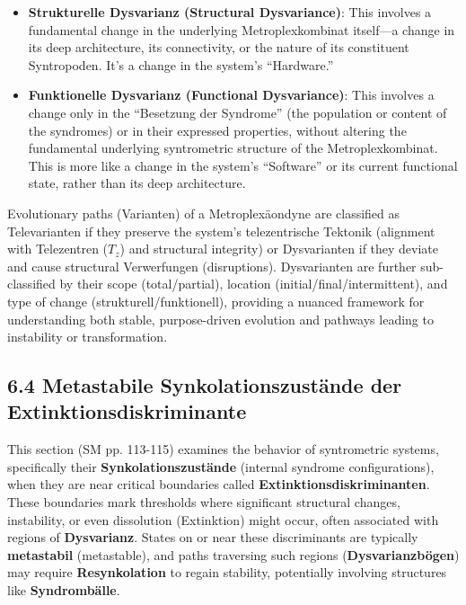 \documentclass[12pt]{article}
\newcommand{\q}[1]{\enquote{#1}}
\newcommand{\telezentrum}{T_z}
\begin{document}
\begin{itemize}
\begin{enumerate}
\begin{itemize}
            \item \textbf{Strukturelle Dysvarianz (Structural Dysvariance)}: This involves a fundamental change in the underlying Metroplexkombinat itself—a change in its deep architecture, its connectivity, or the nature of its constituent Syntropoden. It's a change in the system's \q{Hardware.}
            \item \textbf{Funktionelle Dysvarianz (Functional Dysvariance)}: This involves a change only in the \q{Besetzung der Syndrome} (the population or content of the syndromes) or in their expressed properties, without altering the fundamental underlying syntrometric structure of the Metroplexkombinat. This is more like a change in the system's \q{Software} or its current functional state, rather than its deep architecture.
        \end{itemize}
    \end{enumerate}
\end{itemize}

Evolutionary paths (Varianten) of a Metroplexäondyne are classified as Televarianten if they preserve the system's telezentrische Tektonik (alignment with Telezentren (\(\telezentrum\)) and structural integrity) or Dysvarianten if they deviate and cause structural Verwerfungen (disruptions). Dysvarianten are further sub-classified by their scope (total/partial), location (initial/final/intermittent), and type of change (strukturell/funktionell), providing a nuanced framework for understanding both stable, purpose-driven evolution and pathways leading to instability or transformation.

\subsection{6.4 Metastabile Synkolationszustände der Extinktionsdiskriminante}
\label{sec:metastabilitaet}

This section (SM pp. 113-115) examines the behavior of syntrometric systems, specifically their \textbf{Synkolationszustände} (internal syndrome configurations), when they are near critical boundaries called \textbf{Extinktionsdiskriminanten}. These boundaries mark thresholds where significant structural changes, instability, or even dissolution (Extinktion) might occur, often associated with regions of \textbf{Dysvarianz}. States on or near these discriminants are typically \textbf{metastabil} (metastable), and paths traversing such regions (\textbf{Dysvarianzbögen}) may require \textbf{Resynkolation} to regain stability, potentially involving structures like \textbf{Syndrombälle}.
\end{document}
